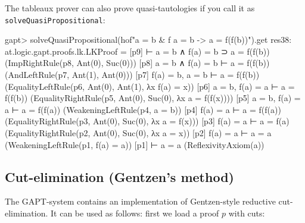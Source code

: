 \documentclass[a4paper,11pt]{article}
\begin{document}
The tableaux prover can also prove quasi-tautologies if you call it as \texttt{solveQuasiPropositional}:
\begin{clilisting}
gapt> solveQuasiPropositional(hof"a = b & f a = b -> a = f(f(b))").get
res38: at.logic.gapt.proofs.lk.LKProof =
[p9]  ⊢ a = b ∧ f(a) = b ⊃ a = f(f(b))    (ImpRightRule(p8, Ant(0), Suc(0)))
[p8] a = b ∧ f(a) = b ⊢ a = f(f(b))    (AndLeftRule(p7, Ant(1), Ant(0)))
[p7] f(a) = b, a = b ⊢ a = f(f(b))    (EqualityLeftRule(p6, Ant(0), Ant(1), λx f(a) = x))
[p6] a = b, f(a) = a ⊢ a = f(f(b))    (EqualityRightRule(p5, Ant(0), Suc(0), λx a = f(f(x))))
[p5] a = b, f(a) = a ⊢ a = f(f(a))    (WeakeningLeftRule(p4, a = b))
[p4] f(a) = a ⊢ a = f(f(a))    (EqualityRightRule(p3, Ant(0), Suc(0), λx a = f(x)))
[p3] f(a) = a ⊢ a = f(a)    (EqualityRightRule(p2, Ant(0), Suc(0), λx a = x))
[p2] f(a) = a ⊢ a = a    (WeakeningLeftRule(p1, f(a) = a))
[p1]  ⊢ a = a    (ReflexivityAxiom(a))

\end{clilisting}

\subsection{Cut-elimination (Gentzen's method)}

The GAPT-system contains an implementation of Gentzen-style reductive
cut-elimination.  It can be used as follows: first we load a proof $p$ with
cuts:
\end{document}
